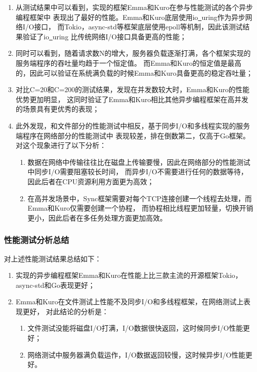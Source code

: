 \documentclass[supercite]{HustGraduPaper}
\theoremstyle{definition}
\begin{document}
\begin{enumerate}[label={(\arabic*)}]
  \item 从测试结果中可以看到，实现的框架Emma和Kuro在参与性能测试的各个异步编程框架中
    表现出了最好的性能。Emma和Kuro底层使用io\underline{~}uring作为异步网络I/O接口，
    而Tokio，async-std等框架底层使用epoll等机制，因此该测试结果验证了io\underline{~}uring
    比传统网络I/O接口具备更高的性能；
  \item 同时可以看到，随着请求数N的增大，服务器负载逐渐打满，各个框架实现的服务端程序的吞吐量均趋于一个恒定值。
    而Emma和Kuro的恒定值是最高的，因此可以验证在系统满负载的时候Emma和Kuro具备更高的稳定吞吐量；
  \item 对比C=20和C=200的测试结果，发现在并发数较大时，Emma和Kuro的性能优势更加明显，
    这同时验证了Emma和Kuro相比其他异步编程框架在高并发的场景具有更优秀的表现；
  \item 此外发现，和文件部分的性能测试中相反，基于同步I/O和多线程实现的服务端程序在网络部分的性能测试中
    表现较差，排在倒数第二，仅高于Go框架。
    对这个现象进行了以下分析：
    \begin{enumerate}
      \item 数据在网络中传输往往比在磁盘上传输要慢，因此在网络部分的性能测试中同步I/O需要阻塞较长时间，
        而异步I/O不需要进行任何的数据等待，因此后者在CPU资源利用方面更为高效；
      \item 在高并发场景中，Sync框架需要对每个TCP连接创建一个线程去处理，而Emma和Kuro仅需要创建一个协程，
        而协程相比线程更加轻量，切换开销更小，因此后者在多任务处理方面更加高效。
    \end{enumerate}
\end{enumerate}

\subsubsection{性能测试分析总结}
对上述性能测试结果总结如下：

\begin{enumerate}[label={(\arabic*)}]
  \item 实现的异步编程框架Emma和Kuro在性能上比三款主流的开源框架Tokio，async-std和Go表现更好；
  \item Emma和Kuro在文件测试上性能不及同步I/O和多线程框架，在网络测试上表现更好，
    对此结论的分析是：
    \begin{enumerate}
      \item 文件测试没能将磁盘I/O打满，I/O数据很快返回，这时候同步I/O性能更好；
      \item 网络测试中服务器满负载运作，I/O数据返回较慢，这时候异步I/O性能更好。
    \end{enumerate}
\end{enumerate}
\end{document}
